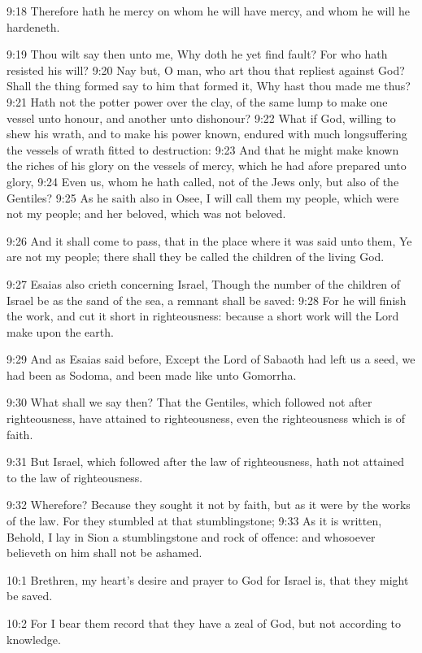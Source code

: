 9:18 Therefore hath he mercy on whom he will have mercy, and whom he
will he hardeneth.

9:19 Thou wilt say then unto me, Why doth he yet find fault? For who
hath resisted his will?  9:20 Nay but, O man, who art thou that
repliest against God? Shall the thing formed say to him that formed
it, Why hast thou made me thus?  9:21 Hath not the potter power over
the clay, of the same lump to make one vessel unto honour, and another
unto dishonour?  9:22 What if God, willing to shew his wrath, and to
make his power known, endured with much longsuffering the vessels of
wrath fitted to destruction: 9:23 And that he might make known the
riches of his glory on the vessels of mercy, which he had afore
prepared unto glory, 9:24 Even us, whom he hath called, not of the
Jews only, but also of the Gentiles?  9:25 As he saith also in Osee, I
will call them my people, which were not my people; and her beloved,
which was not beloved.

9:26 And it shall come to pass, that in the place where it was said
unto them, Ye are not my people; there shall they be called the
children of the living God.

9:27 Esaias also crieth concerning Israel, Though the number of the
children of Israel be as the sand of the sea, a remnant shall be
saved: 9:28 For he will finish the work, and cut it short in
righteousness: because a short work will the Lord make upon the earth.

9:29 And as Esaias said before, Except the Lord of Sabaoth had left us
a seed, we had been as Sodoma, and been made like unto Gomorrha.

9:30 What shall we say then? That the Gentiles, which followed not
after righteousness, have attained to righteousness, even the
righteousness which is of faith.

9:31 But Israel, which followed after the law of righteousness, hath
not attained to the law of righteousness.

9:32 Wherefore? Because they sought it not by faith, but as it were by
the works of the law. For they stumbled at that stumblingstone; 9:33
As it is written, Behold, I lay in Sion a stumblingstone and rock of
offence: and whosoever believeth on him shall not be ashamed.

10:1 Brethren, my heart's desire and prayer to God for Israel is, that
they might be saved.

10:2 For I bear them record that they have a zeal of God, but not
according to knowledge.

